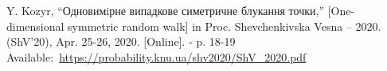 \begin{description}[font=$\bullet$]
\item {Y. Kozyr, “Одновимiрне випадкове симетричне блукання точки,” [One-dimensional symmetric random walk] in Proc. Shevchenkivska Vesna – 2020. (ShV’20), Apr. 25-26, 2020. [Online]. - p. 18-19 Available:~\href{https://probability.knu.ua/shv2020/ShV_2020.pdf}{https://probability.knu.ua/shv2020/ShV\_2020.pdf}}
\end{description}